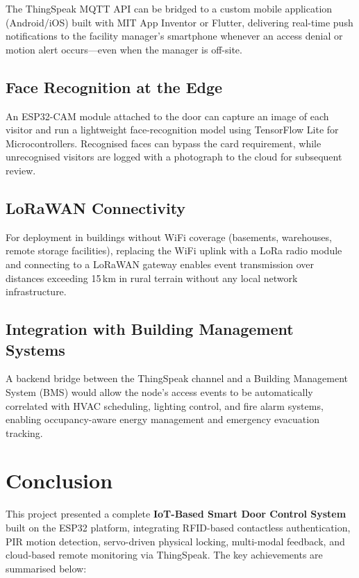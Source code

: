 \documentclass[12pt,a4paper]{article}
\begin{document}
The ThingSpeak MQTT API can be bridged to a custom mobile
application (Android/iOS) built with MIT App Inventor or
Flutter, delivering real-time push notifications to the
facility manager's smartphone whenever an access denial or
motion alert occurs---even when the manager is off-site.

\subsection{Face Recognition at the Edge}

An ESP32-CAM module attached to the door can capture an image
of each visitor and run a lightweight face-recognition model
using TensorFlow Lite for Microcontrollers. Recognised faces
can bypass the card requirement, while unrecognised visitors
are logged with a photograph to the cloud for subsequent review.

\subsection{LoRaWAN Connectivity}

For deployment in buildings without WiFi coverage (basements,
warehouses, remote storage facilities), replacing the WiFi
uplink with a LoRa radio module and connecting to a LoRaWAN
gateway enables event transmission over distances exceeding
15\,km in rural terrain without any local network infrastructure.

\subsection{Integration with Building Management Systems}

A backend bridge between the ThingSpeak channel and a Building
Management System (BMS) would allow the node's access events
to be automatically correlated with HVAC scheduling, lighting
control, and fire alarm systems, enabling occupancy-aware
energy management and emergency evacuation tracking.

\section{Conclusion}
\label{sec:conclusion}

This project presented a complete \textbf{IoT-Based Smart Door
Control System} built on the ESP32 platform, integrating RFID-based
contactless authentication, PIR motion detection, servo-driven
physical locking, multi-modal feedback, and cloud-based remote
monitoring via ThingSpeak. The key achievements are summarised below:
\end{document}
